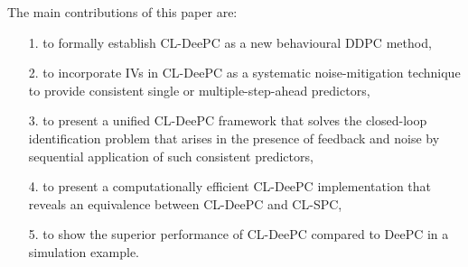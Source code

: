 The main contributions of this paper are: 
\begin{enumerate}%
\item[1.] to formally establish \acf{CL-DeePC} as a new behavioural \ac{DDPC} method, \label{contribution:develop_CL_DeePC}
\item[2.] to incorporate \ac{IVs} in \ac{CL-DeePC} as a systematic noise-mitigation technique to provide consistent single or multiple-step-ahead predictors, \label{contribution:incorporate_IVs}
\item[3.] to present a unified \ac{CL-DeePC} framework that solves the closed-loop identification problem that arises in the presence of feedback and noise by sequential application of such consistent predictors,\label{contribution:solves_CL_issue}
\item[4.] to present a computationally efficient \ac{CL-DeePC} implementation that reveals an equivalence between \ac{CL-DeePC} and \ac{CL-SPC},
\item[5.] to show the superior performance of \ac{CL-DeePC} compared to \ac{DeePC} in a simulation example.
\end{enumerate}
%

